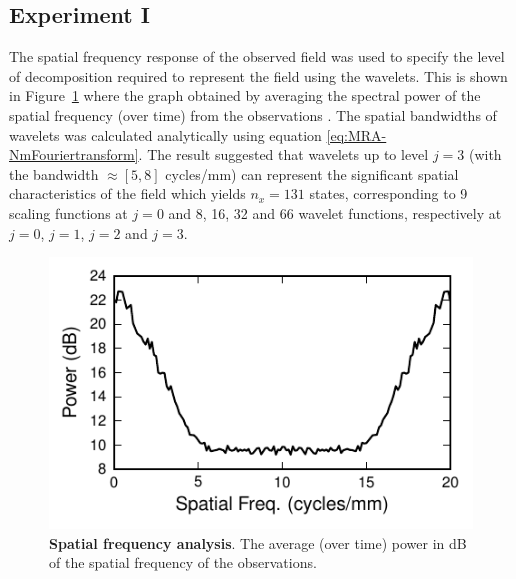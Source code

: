 \documentclass[review,authoryear,3p]{elsarticle}
\begin{document}
\subsection{Experiment I}
The spatial frequency response of the observed field was used to specify the level of decomposition required to represent the field using the wavelets. This is shown in Figure~\ref{fig:ObservationFrequencyResponce} where the graph obtained by averaging the spectral power of the spatial frequency (over time) from the observations \citep{Scerri2009}. The spatial bandwidths of wavelets was calculated analytically using equation \eqref{eq:MRA-NmFouriertransform}. The result suggested that wavelets up to level $j=3$ (with the bandwidth $\approx[5,8]$ cycles/mm) can represent the significant spatial characteristics of the field which yields $n_x = 131$ states, corresponding to 9 scaling functions at $j=0$ and 8, 16, 32 and 66 wavelet functions, respectively at $j=0$, $j=1$, $j=2$ and $j=3$. 
\begin{figure}[!t] 
 	\centering
 		\includegraphics[scale=1]{./Graph/Figure2.pdf}
 		\caption{{\bf Spatial frequency analysis}. The average (over time) power in dB of the spatial frequency of the observations.}
 	\label{fig:ObservationFrequencyResponce}
 \end{figure}
\end{document}
